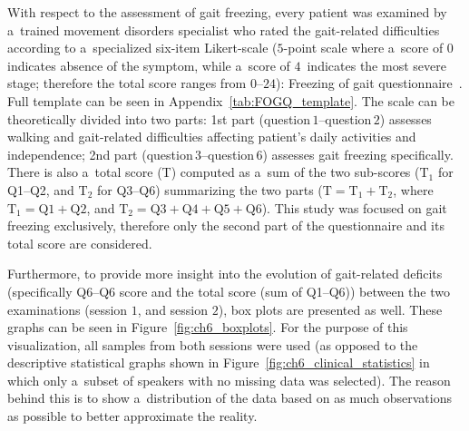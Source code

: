 \newpage
With respect to the assessment of gait freezing, every patient was examined by a~trained movement disorders specialist who rated the gait-related difficulties according to a~specialized six-item Likert-scale ($5$-point scale where a~score of $0$ indicates absence of the symptom, while a~score of $4$~indicates the most severe stage; therefore the total score ranges from $0$--$24$): Freezing of gait questionnaire~\cite{Giladi2000}. Full template can be seen in Appendix~\ref{tab:FOGQ_template}. The scale can be theoretically divided into two parts: 1st part (question\,$1$--question\,$2$) assesses walking and gait-related difficulties affecting patient's daily activities and independence; 2nd part (question\,$3$--question\,$6$) assesses gait freezing specifically. There is also a~total score (T) computed as a~sum of the two sub-scores ($\mbox{T}_1$ for Q1--Q2, and $\mbox{T}_2$ for Q3--Q6) summarizing the two parts ($\mbox{T} = \mbox{T}_1 + \mbox{T}_2$, where $\mbox{T}_1 = \mbox{Q1} + \mbox{Q2}$, and $\mbox{T}_2 = \mbox{Q3} + \mbox{Q4} + \mbox{Q5} + \mbox{Q6}$). This study was focused on gait freezing exclusively, therefore only the second part of the questionnaire and its total score are considered.

Furthermore, to provide more insight into the evolution of gait-related deficits (specifically Q6--Q6 score and the total score (sum of Q1--Q6)) between the two examinations (session $1$, and session $2$), box plots are presented as well. These graphs can be seen in Figure~\ref{fig:ch6_boxplots}. For the purpose of this visualization, all samples from both sessions were used (as opposed to the descriptive statistical graphs shown in Figure~\ref{fig:ch6_clinical_statistics} in which only a~subset of speakers with no missing data was selected). The reason behind this is to show a~distribution of the data based on as much observations as possible to better approximate the reality.

